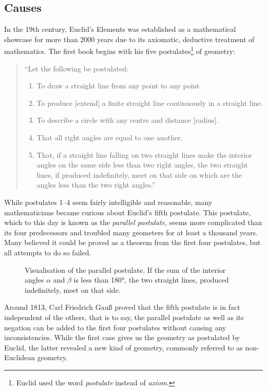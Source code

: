 \documentclass{article}
\begin{document}
\subsection{Causes}\label{ssec_causes}
In the 19th century, Euclid's Elements was established as a mathematical showcase for more than 2000 years due to its axiomatic, deductive treatment of mathematics. The first book begins with his five postulates\footnote{Euclid used the word \textit{postulate} instead of \textit{axiom}.} of geometry:
\begin{quote}
``Let the following be postulated:
\begin{enumerate}
\item To draw a straight line from any point to any point.
\item To produce [extend] a finite straight line continuously in a straight line.
\item To describe a circle with any centre and distance [radius].
\item That all right angles are equal to one another.
\item That, if a straight line falling on two straight lines make the interior angles on the same side less than two right angles, the two straight lines, if produced indefinitely, meet on that side on which are the angles less than the two right angles.''
\end{enumerate}
\end{quote}
While postulates 1--4 seem fairly intelligible and reasonable, many mathematicians became curious about Euclid's fifth postulate. This postulate, which to this day is known as the \textit{parallel postulate}, seems more complicated than its four predecessors and troubled many geometers for at least a thousand years. Many believed it could be proved as a theorem from the first four postulates, but all attempts to do so failed. 

\begin{figure}[h]
	\centering
{}
	\caption{Visualisation of the parallel postulate. If the sum of the interior angles $\alpha$ and $\beta$ is less than 180°, the two straight lines, produced indefinitely, meet on that side.}
\end{figure}
Around 1813, Carl Friedrich Gauß proved that the fifth postulate is in fact independent of the others, that is to say, the parallel postulate as well as its negation can be added to the first four postulates without causing any inconsistencies. While the first case gives us the geometry as postulated by Euclid, the latter revealed a new kind of geometry, commonly referred to as non-Euclidean geometry.
\end{document}
